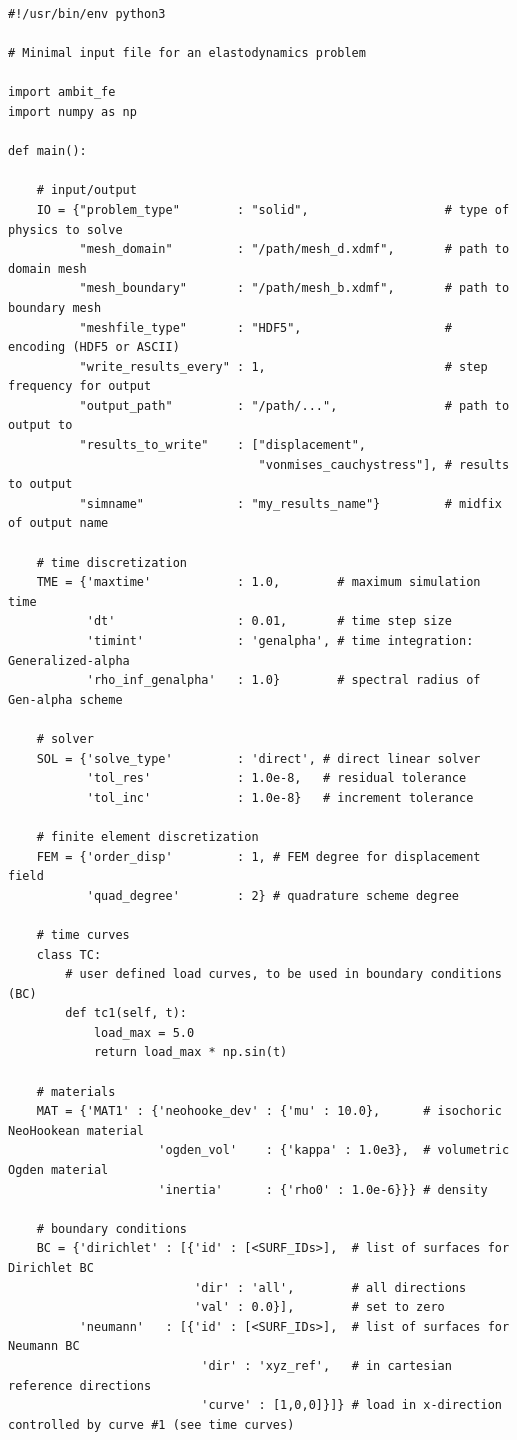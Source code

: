 \documentclass[a4paper,12pt]{report}
\begin{document}
\begin{Verbatim}[breaklines=true]
#!/usr/bin/env python3

# Minimal input file for an elastodynamics problem

import ambit_fe
import numpy as np

def main():

    # input/output
    IO = {"problem_type"        : "solid",                   # type of physics to solve
          "mesh_domain"         : "/path/mesh_d.xdmf",       # path to domain mesh
          "mesh_boundary"       : "/path/mesh_b.xdmf",       # path to boundary mesh
          "meshfile_type"       : "HDF5",                    # encoding (HDF5 or ASCII)
          "write_results_every" : 1,                         # step frequency for output
          "output_path"         : "/path/...",               # path to output to
          "results_to_write"    : ["displacement",
                                   "vonmises_cauchystress"], # results to output
          "simname"             : "my_results_name"}         # midfix of output name
    
    # time discretization  
    TME = {'maxtime'            : 1.0,        # maximum simulation time
           'dt'                 : 0.01,       # time step size
           'timint'             : 'genalpha', # time integration: Generalized-alpha
           'rho_inf_genalpha'   : 1.0}        # spectral radius of Gen-alpha scheme
    
    # solver
    SOL = {'solve_type'         : 'direct', # direct linear solver
           'tol_res'            : 1.0e-8,   # residual tolerance
           'tol_inc'            : 1.0e-8}   # increment tolerance
    
    # finite element discretization
    FEM = {'order_disp'         : 1, # FEM degree for displacement field
           'quad_degree'        : 2} # quadrature scheme degree
    
    # time curves
    class TC:
        # user defined load curves, to be used in boundary conditions (BC)
        def tc1(self, t):
            load_max = 5.0
            return load_max * np.sin(t)

    # materials
    MAT = {'MAT1' : {'neohooke_dev' : {'mu' : 10.0},      # isochoric NeoHookean material
                     'ogden_vol'    : {'kappa' : 1.0e3},  # volumetric Ogden material
                     'inertia'      : {'rho0' : 1.0e-6}}} # density

    # boundary conditions
    BC = {'dirichlet' : [{'id' : [<SURF_IDs>],  # list of surfaces for Dirichlet BC
                          'dir' : 'all',        # all directions
                          'val' : 0.0}],        # set to zero
          'neumann'   : [{'id' : [<SURF_IDs>],  # list of surfaces for Neumann BC
                           'dir' : 'xyz_ref',   # in cartesian reference directions
                           'curve' : [1,0,0]}]} # load in x-direction controlled by curve #1 (see time curves)


\end{Verbatim}
\end{document}
